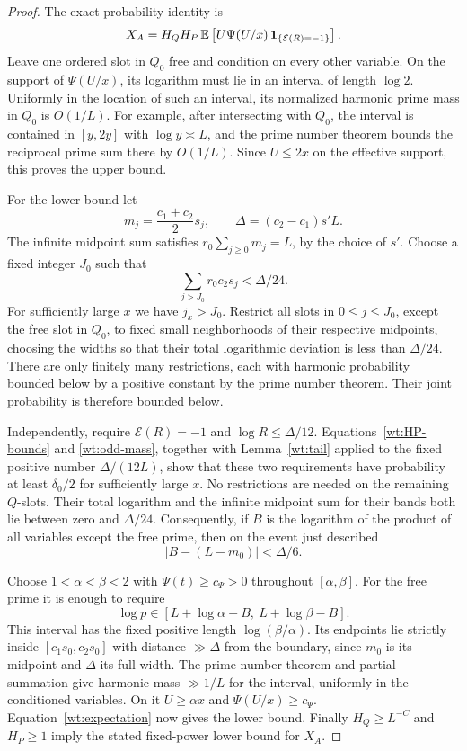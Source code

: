 \begin{proof}
The exact probability identity is
\begin{equation}\label{wt:expectation}
 X_A=H_QH_P\,
 \mathbb E\left[U\Psi(U/x)\,
                   \mathbf{1}_{\{\mathcal E(R)=-1\}}\right].
\end{equation}
Leave one ordered slot in $Q_0$ free and condition on every other
variable. On the support of $\Psi(U/x)$, its logarithm must lie in an
interval of length $\log2$. Uniformly in the location of such an
interval, its normalized harmonic prime mass in $Q_0$ is $O(1/L)$.
For example, after intersecting with $Q_0$, the interval is contained
in $[y,2y]$ with $\log y\asymp L$, and the prime number theorem bounds
the reciprocal prime sum there by $O(1/L)$.
Since $U\le2x$ on the effective support, this proves the upper bound.

For the lower bound let
\[
 m_j=\frac{c_1+c_2}{2}s_j,
 \qquad \Delta=(c_2-c_1)s'L.
\]
The infinite midpoint sum satisfies
$r_0\sum_{j\ge0}m_j=L$, by the choice of $s'$.
Choose a fixed integer $J_0$ such that
\[
 \sum_{j>J_0}r_0c_2s_j<\Delta/24.
\]
For sufficiently large $x$ we have $j_x>J_0$. Restrict all slots in
$0\le j\le J_0$, except the free slot in $Q_0$, to fixed small
neighborhoods of their respective midpoints, choosing the widths so
that their total logarithmic deviation is less than $\Delta/24$.
There are only finitely many restrictions, each with harmonic
probability bounded below by a positive constant by the prime number
theorem. Their joint probability is therefore bounded below.

Independently, require $\mathcal E(R)=-1$ and
$\log R\le\Delta/12$. Equations~\eqref{wt:HP-bounds} and
\eqref{wt:odd-mass}, together with Lemma~\ref{wt:tail} applied to the
fixed positive number $\Delta/(12L)$, show that these two requirements
have probability at least $\delta_0/2$ for sufficiently large $x$.
No restrictions are needed on the remaining $Q$-slots. Their total
logarithm and the infinite midpoint sum for their bands both lie
between zero and $\Delta/24$. Consequently, if $B$ is the logarithm
of the product of all variables except the free prime, then on the
event just described
\[
 \left|B-(L-m_0)\right|<\Delta/6.
\]

Choose $1<\alpha<\beta<2$ with
$\Psi(t)\ge c_\Psi>0$ throughout $[\alpha,\beta]$.
For the free prime it is enough to require
\[
 \log p\in[L+\log\alpha-B,\ L+\log\beta-B].
\]
This interval has the fixed positive length $\log(\beta/\alpha)$.
Its endpoints lie strictly inside $[c_1s_0,c_2s_0]$ with distance
$\gg\Delta$ from the boundary, since $m_0$ is its midpoint and
$\Delta$ its full width. The prime number theorem and partial
summation give harmonic mass $\gg1/L$ for the interval, uniformly in
the conditioned variables. On it $U\ge\alpha x$ and
$\Psi(U/x)\ge c_\Psi$. Equation~\eqref{wt:expectation} now gives the
lower bound. Finally $H_Q\ge L^{-C}$ and $H_P\ge1$ imply the stated
fixed-power lower bound for $X_A$.
\end{proof}

